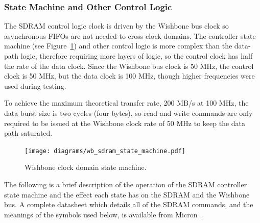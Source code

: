 \subsubsection{State Machine and Other Control Logic}
The SDRAM control logic clock is driven by the Wishbone bus clock so asynchronous
FIFOs are not needed to cross clock domains. The controller state machine (see
Figure~\ref{MEM_SDRAM_SM}) and other control logic is more complex than the
data-path logic, therefore requiring more layers of logic, so the control clock
has half the rate of the data clock. Since the Wishbone bus clock is 50 MHz, the
control clock is 50 MHz, but the data clock is 100 MHz, though higher frequencies
were used during testing.

To achieve the maximum theoretical transfer rate, 200 MB/s at 100 MHz, the data
burst size is two cycles (four bytes), so read and write commands are only
required to be issued at the Wishbone clock rate of 50 MHz to keep the data path
saturated.

\begin{figure}[h!]
\begin{center}
\texttt{[image: diagrams/wb\_sdram\_state\_machine.pdf]}
\caption[Wishbone Clock Domain State Machine]{Wishbone clock domain state
machine.}
\end{center}
\label{MEM_SDRAM_SM}
\end{figure}

The following is a brief description of the operation of the SDRAM controller
state machine and the effect each state has on the SDRAM and the Wishbone bus. A
complete datasheet which details all of the SDRAM commands, and the meanings of
the symbols used below, is available from Micron~\cite{Micron_SDRAM_DS}.


